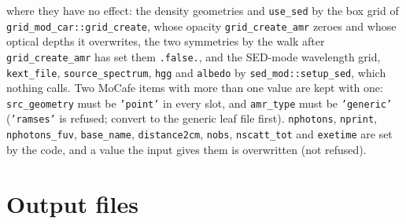\documentclass[english,a4paper]{my_memo}
\newcommand{\code}[1]{\texttt{#1}}
\begin{document}
where they have no effect: the density geometries and \code{use\_sed} by the
box grid of \code{grid\_mod\_car::grid\_create}, whose opacity
\code{grid\_create\_amr} zeroes and whose optical depths it overwrites, the
two symmetries by the walk after \code{grid\_create\_amr} has set them
\code{.false.}, and the SED-mode wavelength grid, \code{kext\_file},
\code{source\_spectrum}, \code{hgg} and \code{albedo} by
\code{sed\_mod::setup\_sed}, which nothing calls.  Two MoCafe items with
more than one value are kept with one: \code{src\_geometry} must be
\code{'point'} in every slot, and \code{amr\_type} must be
\code{'generic'} (\code{'ramses'} is refused; convert to the generic leaf
file first).  \code{nphotons}, \code{nprint}, \code{nphotons\_fuv},
\code{base\_name}, \code{distance2cm}, \code{nobs}, \code{nscatt\_tot} and
\code{exetime} are set by the code, and a value the input gives them is
overwritten (not refused).

\section{Output files}
\label{sec:outputs}
\end{document}
